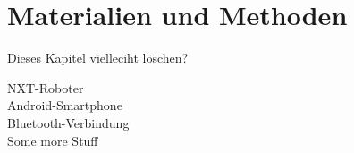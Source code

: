 \chapter{Materialien und Methoden}
\label{cha:Materials}

Dieses Kapitel vielleciht löschen?




NXT-Roboter\\

Android-Smartphone\\

Bluetooth-Verbindung\\

Some more Stuff\\

